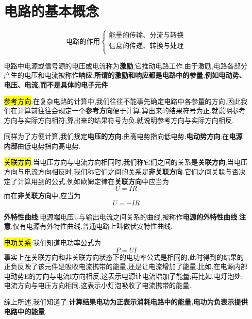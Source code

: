 \section{\K 电路的基本概念}
\begin{equation*}
    \text{电路的作用}\begin{cases}
        \text{能量的传输、分流与转换}\\
        \text{信息的传递、转换与处理}\\
    \end{cases}
\end{equation*}

\Par 电路中电源或信号源的电压或电流称为\textbf{激励},它推动电路工作.由于激励,电路各部分产生的电压和电流被称作\textbf{响应}.\textbf{所谓的激励和响应都是电路中的参量,例如电动势、电压、电流,而不是具体的电子元件}.

\hl{参考方向}:在复杂电路的计算中,我们往往不能事先确定电路中各参量的方向,因此我们在计算前往往会规定一个\textbf{参考方向}便于计算,算出来的结果符号为正,就说明参考方向与实际方向相符;算出来的结果符号为负,就说明参考方向与实际方向相反.

\Par 同样为了方便计算,我们规定\textbf{电压的方向}:由高电势指向低电势;\textbf{电动势方向}:在\textbf{电源内部}由低电势指向高电势.

\hl{关联方向}:当电压方向与电流方向相同时,我们称它们之间的关系是\textbf{关联方向};当电压方向与电流方向相反时,我们称它们之间的关系是\textbf{非关联方向}.它们之间关联与否决定了计算用到的公式,例如欧姆定律在\textbf{关联方向}中应当为
\begin{equation}
    U=IR
\end{equation}
而在\textbf{非关联方向}中,应当为
\begin{equation}
    U=-IR
\end{equation}

\textbf{外特性曲线}:电源端电压U与输出电流之间关系的曲线,被称作\textbf{电源的外特性曲线}.\textbf{注意},仅有电源有外特性曲线,普通电路上叫做伏安特性曲线.

\hl{电功关系}:我们知道电功率公式为
\begin{equation}
    P=UI
\end{equation}
事实上在关联方向和非关联方向状态下的电功率公式是相同的,此时得到的结果的正负反映了该元件是吸收电流携带的能量,还是让电流增加了能量.比如,在电源内部电动势E的方向与电流I方向相反,这表示电源让电流增加了能量;再比如,电灯泡处,电流方向与电压方向相同,这表示小灯泡吸收了电流携带的能量.

\Par 综上所述,我们知道了:\textbf{计算结果电功为正表示消耗电路中的能量,电功为负表示提供电路中的能量}.

